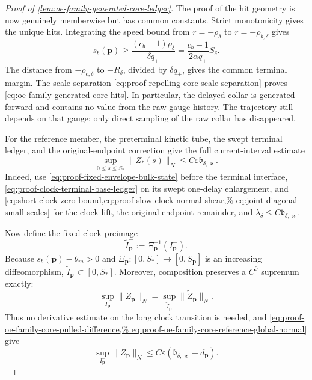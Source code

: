 \begin{proof}[Proof of
\cref{lem:oe-family-generated-core-ledger}]
The proof of the hit geometry is now genuinely memberwise but has common
constants.  Strict monotonicity gives the unique hits.  Integrating the
speed bound from \(r=-\rho_\delta\) to
\(r=-\rho_{b,\delta}\) gives
\begin{equation}
 s_b(\mathbf p)
 \ge\frac{(c_b-1)\rho_\delta}{\delta q_+}
 =\frac{c_b-1}{2\alpha q_+}S_\delta.            \label{eq:proof-oe-family-core-entry-margin}
\end{equation}
The distance from \(-\rho_{c,\delta}\) to \(-R_\delta\), divided by
\(\delta q_+\), gives the common terminal margin.  The scale separation
\cref{eq:proof-repelling-core-scale-separation} proves
\cref{eq:oe-family-generated-core-hits}.  In particular, the delayed
collar is generated forward and contains no value from the raw gauge
history.  The trajectory still depends on that gauge; only direct sampling
of the raw collar has disappeared.

For the reference member, the preterminal kinetic tube, the swept
terminal ledger, and the original-endpoint correction give the full
current-interval estimate
\begin{equation}
 \sup_{0\le s\le S_*}\|Z_*(s)\|_N
 \le C\varepsilon\mathfrak b_{\delta,\varkappa}.           \label{eq:proof-oe-family-core-reference-global-normal}
\end{equation}
Indeed, use
\cref{eq:proof-fixed-envelope-bulk-state} before the terminal interface,
\cref{eq:proof-clock-terminal-base-ledger} on its swept one-delay
enlargement, and
\cref{eq:short-clock-zero-bound,eq:proof-slow-clock-normal-shear,%
eq:joint-diagonal-small-scales} for the clock lift, the
original-endpoint remainder, and \(\lambda_\delta\le
C\mathfrak b_{\delta,\varkappa}\).

Now define the fixed-clock preimage
\[
 \widetilde I_{\mathbf p}^-
 :=\Xi_{\mathbf p}^{-1}(I_{\mathbf p}^-).
\]
Because \(s_b(\mathbf p)-\theta_m>0\) and
\(\Xi_{\mathbf p}:[0,S_*]\to[0,S_{\mathbf p}]\) is an increasing
diffeomorphism, \(\widetilde I_{\mathbf p}^-\subset[0,S_*]\).  Moreover,
composition preserves a \(C^0\) supremum exactly:
\[
 \sup_{I_{\mathbf p}^-}\|Z_{\mathbf p}\|_N
 =\sup_{\widetilde I_{\mathbf p}^-}
       \|\widetilde Z_{\mathbf p}\|_N.
\]
Thus no derivative estimate on the long clock transition is needed, and
\cref{eq:proof-oe-family-core-pulled-difference,%
eq:proof-oe-family-core-reference-global-normal} give
\begin{equation}
 \sup_{I_{\mathbf p}^-}\|Z_{\mathbf p}\|_N
 \le C\varepsilon
       (\mathfrak b_{\delta,\varkappa}+d_{\mathbf p}).       \label{eq:proof-oe-family-core-normal-size}
\end{equation}


\end{proof}
